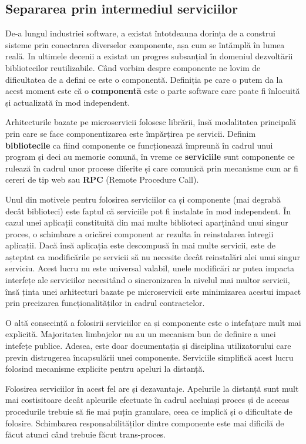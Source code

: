 \documentclass[12pt, a4paper, oneside, romanian]{teza-upb}
\begin{document}
\subsection{Separarea prin intermediul serviciilor}

De-a lungul industriei software, a existat întotdeauna dorința de a construi sisteme prin conectarea diverselor componente, așa cum se întămplă în lumea reală. In ultimele decenii a existat un progres subsanțial în domeniul dezvoltării bibliotecilor reutilizabile. Când vorbim despre componente ne lovim de dificultatea de a defini ce este o componentă. Definiția pe care o putem da la acest moment este că o \textbf{componentă} este o parte software care poate fi înlocuită și actualizată în mod independent. 

Arhitecturile bazate pe microservicii folosesc librării, însă modalitatea principală prin care se face componentizarea este împărțirea pe servicii. Definim \textbf{bibliotecile} ca fiind componente ce funcționează împreună în cadrul unui program și deci au memorie comună, în vreme ce \textbf{serviciile} sunt componente ce rulează în cadrul unor procese diferite și care comunică prin mecanisme cum ar fi cereri de tip web sau \textbf{RPC} (Remote Procedure Call).

Unul din motivele pentru folosirea serviciilor ca și componente (mai degrabă decât biblioteci) este faptul că serviciile pot fi instalate în mod independent. În cazul unei aplicații constituită din mai multe biblioteci aparținând unui singur proces, o schimbare a oricărei component ar rezulta în reinstalarea întregii aplicații. Dacă însă aplicația este descompusă în mai multe servicii, este de așteptat ca modificările pe servicii să nu necesite decât reinstalări alei unui singur serviciu. Acest lucru nu este universal valabil, unele modificări ar putea impacta interfețe ale serviciilor necesitând o sincronizarea la nivelul mai multor servicii, însă ținta unei arhitecturi bazate pe microservicii este minimizarea acestui impact prin precizarea funcționalităților in cadrul contractelor.	

O altă consecință a folosirii serviciilor ca și componente este o intefațare mult mai explicită. Majoritatea limbajelor nu au un mecanism bun de definire a unei intefețe publice. Adesea, este doar documentația și disciplina utilizatorului care previn distrugerea încapsulării unei componente. Serviciile simplifică acest lucru folosind mecanisme explicite pentru apeluri la distanță.

Folosirea serviciilor în acest fel are și dezavantaje. Apelurile la distanță sunt mult mai costisitoare decât apleurile efectuate în cadrul aceluiași proces și de aceeas procedurile trebuie să fie mai puțin granulare, ceea ce implică și o dificultate de folosire. Schimbarea responsabilităților dintre componente este mai dificilă de făcut atunci când trebuie făcut trans-proces.
\end{document}
